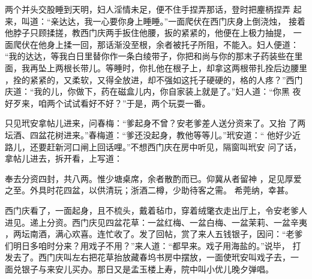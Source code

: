 两个并头交股睡到天明，妇人淫情未足，便不住手捏弄那话，登时把麈柄捏弄
起来，叫道：“亲达达，我一心要你身上睡睡。”一面爬伏在西门庆身上倒浇烛，
接着他脖子只顾揉搓，教西门庆两手扳住他腰，扳的紧紧的，他便在上极力抽提，
一面爬伏在他身上揉一回，那话渐没至根，余者被托子所阻，不能入。妇人便道：
“我的达达，等我白日里替你作一条白绫带子，你把和尚与你的那末子药装些在里
面，我再坠上两根长带儿。等睡时，你扎他在根子上，却拿这两根带扎拴后边腰里
，拴的紧紧的，又柔软，又得全放进，却不强如这托子硬硬的，格的人疼？”西门
庆道：“我的儿，你做下，药在磁盒儿内，你自家装上就是了。”妇人道：“你黑
夜好歹来，咱两个试试看好不好？”于是，两个玩耍一番。

只见玳安拿帖儿进来，问春梅：“爹起身不曾？安老爹差人送分资来了。又抬
了两坛酒、四盆花树进来。”春梅道：“爹还没起身，教他等等儿。”玳安道：“
他好少近路儿，还要赶新河口闸上回话哩。”不想西门庆在房中听见，隔窗叫玳安
问了话，拿帖儿进去，拆开看，上写道：

奉去分资四封，共八两。惟少塘桌席，余者散酌而已。仰冀从者留神
，足见厚爱之至。外具时花四盆，以供清玩；浙酒二樽，少助待客之需。
希莞纳，幸甚。

西门庆看了，一面起身，且不梳头，戴着毡巾，穿着绒氅衣走出厅上，令安老爹人
进见。递上分资。西门庆见四盆花草：一盆红梅、一盆白梅、一盆茉莉、一盆辛夷
，两坛南酒，满心欢喜。连忙收了。发了回帖，赏了来人五钱银子，因问：“老爹
们明日多咱时分来？用戏子不用？”来人道：“都早来。戏子用海盐的。”说毕，
打发去了。西门庆叫左右把花草抬放藏春坞书房中摆放，一面使玳安叫戏子去，一
面兑银子与来安儿买办。那日又是孟玉楼上寿，院中叫小优儿晚夕弹唱。

